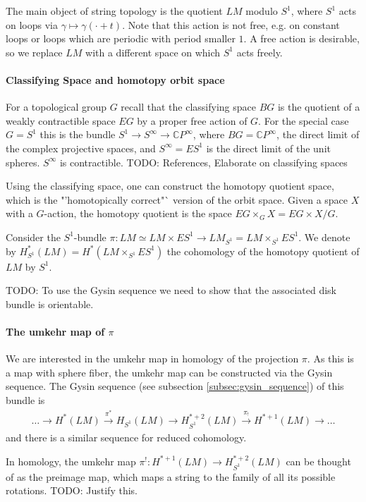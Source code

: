 \documentclass{scrartcl}
\theoremstyle{plain}
\theoremstyle{definition}
\newcommand{\C}{\mathbb C}
\begin{document}
The main object of string topology is the quotient $LM$ modulo $S^1$, where $S^1$ acts on loops via $\gamma\mapsto \gamma(\cdot + t)$. Note that this action is not free, e.g. on constant loops or loops which are periodic with period smaller $1$. A free action is desirable, so we replace $LM$ with a different space on which $S^1$ acts freely.

\paragraph{Classifying Space and homotopy orbit space} For a topological group $G$ recall that the classifying space $BG$ is the quotient of a weakly contractible space $EG$ by a proper free action of $G$. For the special case $G=S^1$ this is the bundle $S^1\to S^\infty\to \C P^\infty$, where $BG = \C P^\infty$, the direct limit of the complex projective spaces, and $S^\infty = ES^1$ is the direct limit of the unit spheres. $S^\infty$ is contractible. TODO: References, Elaborate on classifying spaces

Using the classifying space, one can construct the homotopy quotient space, which is the "'homotopically correct"` version of the orbit space. Given a space $X$ with a $G$-action, the homotopy quotient is the space $EG\times_G X = EG\times X / G$. 

Consider the $S^1$-bundle $\pi\colon LM\simeq LM\times ES^1\to LM_{S^1} = LM\times_{S^1} ES^1$. We denote by $H^*_{S^1}(LM) = H^*(LM\times_{S^1} ES^1)$ the cohomology of the homotopy quotient of $LM$ by $S^1$. 

TODO: To use the Gysin sequence we need to show that the associated disk bundle is orientable.

\paragraph{The umkehr map of $\pi$} We are interested in the umkehr map in homology of the projection $\pi$. As this is a map with sphere fiber, the umkehr map can be constructed via the Gysin sequence. The Gysin sequence (see subsection \ref{subsec:gysin_sequence}) of this bundle is 
\begin{align*}
    \dots \to H^*(LM)\xrightarrow{\pi^*} H_{S^1}(LM) \to H^{*+2}_{S^1}(LM) \xrightarrow{\pi_!} H^{*+1}(LM) \to \dots
\end{align*}
and there is a similar sequence for reduced cohomology. 

In homology, the umkehr map $\pi^!\colon H^{*+1}(LM)\to H^{*+2}_{S^1}(LM)$ can be thought of as the preimage map, which maps a string to the family of all its possible rotations. TODO: Justify this.
\end{document}
